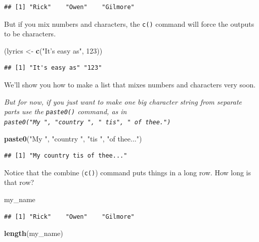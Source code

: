 \documentclass[]{article}
\newenvironment{Shaded}{\begin{snugshade}}{\end{snugshade}}
\newcommand{\KeywordTok}[1]{\textcolor[rgb]{0.13,0.29,0.53}{\textbf{#1}}}
\newcommand{\DecValTok}[1]{\textcolor[rgb]{0.00,0.00,0.81}{#1}}
\newcommand{\StringTok}[1]{\textcolor[rgb]{0.31,0.60,0.02}{#1}}
\newcommand{\NormalTok}[1]{#1}
\begin{document}
\begin{verbatim}
## [1] "Rick"    "Owen"    "Gilmore"
\end{verbatim}

But if you mix numbers and characters, the \texttt{c()} command will
force the outputs to be characters.

\begin{Shaded}
\begin{Highlighting}[]
\NormalTok{(lyrics <-}\StringTok{ }\KeywordTok{c}\NormalTok{(}\StringTok{"It's easy as"}\NormalTok{, }\DecValTok{123}\NormalTok{))}
\end{Highlighting}
\end{Shaded}

\begin{verbatim}
## [1] "It's easy as" "123"
\end{verbatim}

We'll show you how to make a list that mixes numbers and characters very
soon.

\emph{But for now, if you just want to make one big character string
from separate parts use the \texttt{paste0()} command, as in
\texttt{paste0("My\ ",\ "country\ ",\ "\ tis",\ "\ of\ thee.")}}

\begin{Shaded}
\begin{Highlighting}[]
\KeywordTok{paste0}\NormalTok{(}\StringTok{"My "}\NormalTok{, }\StringTok{"country "}\NormalTok{, }\StringTok{"tis "}\NormalTok{, }\StringTok{"of thee..."}\NormalTok{)}
\end{Highlighting}
\end{Shaded}

\begin{verbatim}
## [1] "My country tis of thee..."
\end{verbatim}

Notice that the combine (\texttt{c()}) command puts things in a long
row. How long is that row?

\begin{Shaded}
\begin{Highlighting}[]
\NormalTok{my_name}
\end{Highlighting}
\end{Shaded}

\begin{verbatim}
## [1] "Rick"    "Owen"    "Gilmore"
\end{verbatim}

\begin{Shaded}
\begin{Highlighting}[]
\KeywordTok{length}\NormalTok{(my_name)}
\end{Highlighting}
\end{Shaded}
\end{document}
